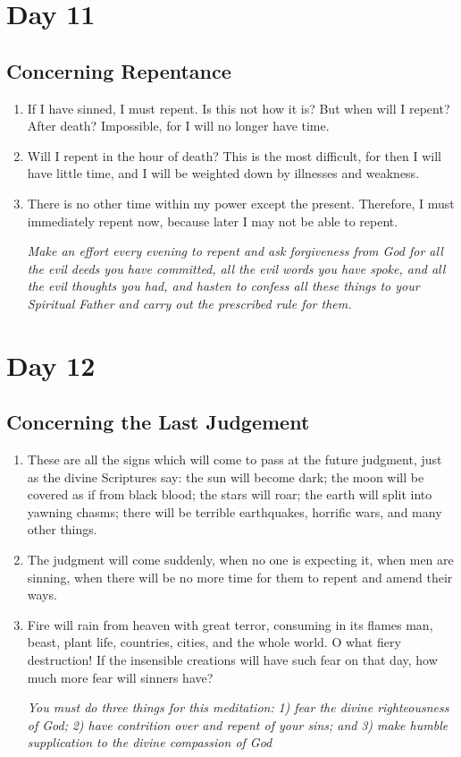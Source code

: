 \documentclass[11pt]{article}
\begin{document}
\section{Day 11}
\label{sec:orge74ff12}
\subsection{Concerning Repentance}
\label{sec:org7c07ac6}
\begin{enumerate}
\item If I have sinned, I must repent. Is this not how it is? But when will I repent? After death? Impossible, for I will no longer have time.
\item Will I repent in the hour of death? This is the most difficult, for then I will have little time, and I will be weighted down by illnesses and weakness.
\item There is no other time within my power except the present. Therefore, I must immediately repent now, because later I may not be able to repent.

\emph{Make an effort every evening to repent and ask forgiveness from God for all the evil deeds you have committed, all the evil words you have spoke, and all the evil thoughts you had, and hasten to confess all these things to your Spiritual Father and carry out the prescribed rule for them.}
\end{enumerate}
\section{Day 12}
\label{sec:org488f3d9}
\subsection{Concerning the Last Judgement}
\label{sec:orgfd3ca24}
\begin{enumerate}
\item These are all the signs which will come to pass at the future judgment, just as the divine Scriptures say: the sun will become dark; the moon will be covered as if from black blood; the stars will roar; the earth will split into yawning chasms; there will be terrible earthquakes, horrific wars, and many other things.
\item The judgment will come suddenly, when no one is expecting it, when men are sinning, when there will be no more time for them to repent and amend their ways.
\item Fire will rain from heaven with great terror, consuming in its flames man, beast, plant life, countries, cities, and the whole world. O what fiery destruction! If the insensible creations will have such fear on that day, how much more fear will sinners have?

\emph{You must do three things for this meditation:}
\emph{1) fear the divine righteousness of God;}
\emph{2) have contrition over and repent of your sins; and}
\emph{3) make humble supplication to the divine compassion of God}
\end{enumerate}
\end{document}
